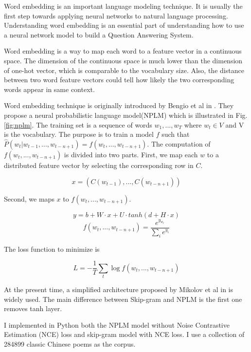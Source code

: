 \documentclass[12pt]{article}
\begin{document}
Word embedding is an important language modeling technique. It is usually the first step towards applying neural networks to natural language processing. Understanding word embedding is an essential part of understanding how to use a neural network model to build a Question Answering System.

Word embedding is a way to map each word to a feature vector in a continuous space. The dimension of the continuous space is much lower than the dimension of one-hot vector, which is comparable to the vocabulary size. Also, the distance between two word feature vectors could tell how likely the two corresponding words appear in same context.

Word embedding technique is originally introduced by Bengio et al in \cite{bengio2003neural}. They propose a neural probabilistic language model(NPLM) which is illustrated in Fig.\ref{fig:nplm}. The training set is a sequence of words $w_1,...,w_T$ where $w_t \in V$ and V is the vocabulary. The purpose is to train a model $f$ such that $ \hat{P}(w_t | w_{t-1},...,w_{t-n+1}) = f(w_t, ..., w_{t-n+1})$. The computation of $f(w_t, ..., w_{t-n+1})$ is divided into two parts.
First, we map each $w$ to a distributed feature vector by selecting the corresponding row in $C$.

$$x=(C(w_{t-1}),... ,C(w_{t-n+1}))$$

Second, we maps $x$ to $f(w_t, ..., w_{t-n+1})$.


$$y=b+W\cdot x + U\cdot tanh(d + H\cdot x)$$
$$ f(w_t, ..., w_{t-n+1}) = \frac{e^{y_{w_t}}}{\sum_{i}^{}e^{y_i}}$$

The loss function to minimize is

$$L = -\frac{1}{T}\sum _{t}^{} \log{f(w_t, ..., w_{t-n+1})}$$


At the present time, a simplified architecture proposed by Mikolov et al in \cite{mikolov2013efficient} is widely used. The main difference between Skip-gram and NPLM is the first one removes tanh layer.

I implemented in Python both the NPLM model without Noise Contrastive Estimation (NCE) loss and skip-gram model with NCE loss. I use a collection of 284899 classic Chinese poems as the corpus.
\end{document}
